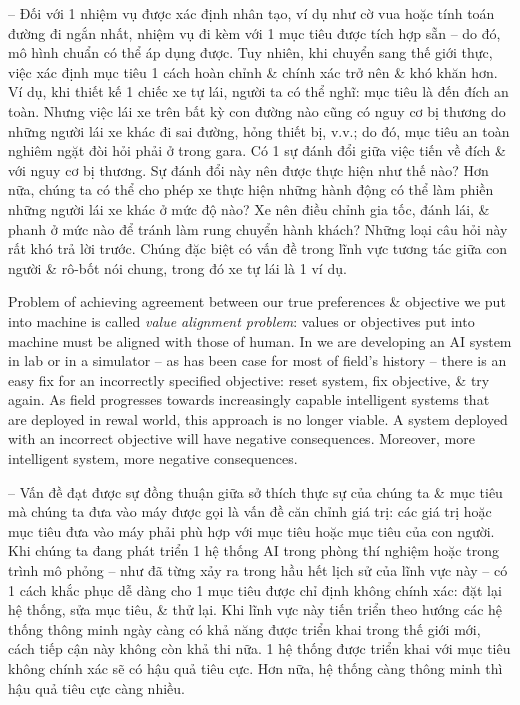 \documentclass{article}
\begin{document}
\begin{itemize}
\begin{itemize}
\begin{itemize}
\begin{itemize}
				-- Đối với 1 nhiệm vụ được xác định nhân tạo, ví dụ như cờ vua hoặc tính toán đường đi ngắn nhất, nhiệm vụ đi kèm với 1 mục tiêu được tích hợp sẵn -- do đó, mô hình chuẩn có thể áp dụng được. Tuy nhiên, khi chuyển sang thế giới thực, việc xác định mục tiêu 1 cách hoàn chỉnh \& chính xác trở nên \& khó khăn hơn. Ví dụ, khi thiết kế 1 chiếc xe tự lái, người ta có thể nghĩ: mục tiêu là đến đích an toàn. Nhưng việc lái xe trên bất kỳ con đường nào cũng có nguy cơ bị thương do những người lái xe khác đi sai đường, hỏng thiết bị, v.v.; do đó, mục tiêu an toàn nghiêm ngặt đòi hỏi phải ở trong gara. Có 1 sự đánh đổi giữa việc tiến về đích \& với nguy cơ bị thương. Sự đánh đổi này nên được thực hiện như thế nào? Hơn nữa, chúng ta có thể cho phép xe thực hiện những hành động có thể làm phiền những người lái xe khác ở mức độ nào? Xe nên điều chỉnh gia tốc, đánh lái, \& phanh ở mức nào để tránh làm rung chuyển hành khách? Những loại câu hỏi này rất khó trả lời trước. Chúng đặc biệt có vấn đề trong lĩnh vực tương tác giữa con người \& rô-bốt nói chung, trong đó xe tự lái là 1 ví dụ.

				Problem of achieving agreement between our true preferences \& objective we put into machine is called {\it value alignment problem}: values or objectives put into machine must be aligned with those of human. In we are developing an AI system in lab or in a simulator -- as has been case for most of field's history -- there is an easy fix for an incorrectly specified objective: reset system, fix objective, \& try again. As field progresses towards increasingly capable intelligent systems that are deployed in rewal world, this approach is no longer viable. A system deployed with an incorrect objective will have negative consequences. Moreover, more intelligent system, more negative consequences.

				-- Vấn đề đạt được sự đồng thuận giữa sở thích thực sự của chúng ta \& mục tiêu mà chúng ta đưa vào máy được gọi là vấn đề căn chỉnh giá trị: các giá trị hoặc mục tiêu đưa vào máy phải phù hợp với mục tiêu hoặc mục tiêu của con người. Khi chúng ta đang phát triển 1 hệ thống AI trong phòng thí nghiệm hoặc trong trình mô phỏng -- như đã từng xảy ra trong hầu hết lịch sử của lĩnh vực này -- có 1 cách khắc phục dễ dàng cho 1 mục tiêu được chỉ định không chính xác: đặt lại hệ thống, sửa mục tiêu, \& thử lại. Khi lĩnh vực này tiến triển theo hướng các hệ thống thông minh ngày càng có khả năng được triển khai trong thế giới mới, cách tiếp cận này không còn khả thi nữa. 1 hệ thống được triển khai với mục tiêu không chính xác sẽ có hậu quả tiêu cực. Hơn nữa, hệ thống càng thông minh thì hậu quả tiêu cực càng nhiều.


\end{itemize}
\end{itemize}
\end{itemize}
\end{itemize}
\end{document}
